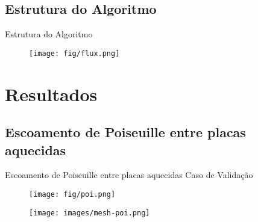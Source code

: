 \documentclass{beamer}
\begin{document}
    
    \subsection{Estrutura do Algoritmo}    
    \begin{frame}{Estrutura do Algoritmo}
        
        \begin{figure}
        	\texttt{[image: fig/flux.png]}
        \end{figure}
    \end{frame}
    
    
    
\section{Resultados}
        
        
    \subsection{Escoamento de Poiseuille entre placas aquecidas}
    \begin{frame}{Escoamento de Poiseuille entre placas aquecidas}
    Caso de Validação 
		\begin{figure}[H]
    		\texttt{[image: fig/poi.png]}
		 \end{figure}
		 \vspace{-0.5cm}
		\begin{figure}[H]
    		\texttt{[image: images/mesh-poi.png]}
		 \end{figure}


	\end{frame}
   
   
\end{document}
